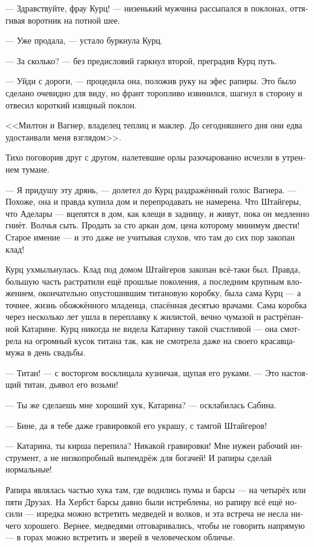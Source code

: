 \documentclass[a4paper,12pt,fleqn]{book}\usepackage{polyglossia}\setdefaultlanguage[babelshorthands=true]{russian}\setotherlanguage{english}\defaultfontfeatures{Ligatures=TeX,Mapping=tex-text}\usepackage{xcolor}\newcommand{\ml}[3]{#2}
\begin{document}
--- Здравствуйте, фрау Курц! --- низенький мужчина рассыпался в поклонах, оттягивая воротник на потной шее.

\ml{$0$}
{--- Уже продала, --- устало буркнула Курц.}
{``Already sold,'' Kurz wearily grumped.}

--- За сколько? --- без предисловий гаркнул второй, преградив Курц путь.

\ml{$0$}
{--- Уйди с дороги, --- процедила она, положив руку на эфес рапиры.}
{``You're on my way, man,'' she hissed with her hand on the foil hilt.}
Это было сделано очевидно для виду, но франт торопливо извинился, шагнул в сторону и отвесил короткий изящный поклон.

<<Милтон и Вагнер, владелец теплиц и маклер.
До сегодняшнего дня они едва удостаивали меня взглядом>>.

Тихо поговорив друг с другом, налетевшие орлы разочарованно исчезли в утреннем тумане.

--- Я придушу эту дрянь, --- долетел до Курц раздражённый голос Вагнера.
--- Похоже, она и правда купила дом и перепродавать не намерена.
Что Штайгеры, что Аделары --- вцепятся в дом, как клещи в задницу, и живут, пока он медленно гниёт.
Волчья сыть.
Продать за сто аркан дом, цена которому минимум двести!
Старое имение --- и это даже не учитывая слухов, что там до сих пор закопан клад!

Курц ухмыльнулась.
Клад под домом Штайгеров закопан всё-таки был.
Правда, большую часть растратили ещё прошлые поколения, а последним крупным вложением, окончательно опустошившим титановую коробку, была сама Курц --- а точнее, жизнь обожжённого младенца, спасённая десятью врачами.
Сама коробка через несколько лет ушла в переплавку к жилистой, вечно чумазой и растрёпанной Катарине.
Курц никогда не видела Катарину такой счастливой --- она смотрела на огромный кусок титана так, как не смотрела даже на своего красавца-мужа в день свадьбы.

--- Титан! --- с восторгом восклицала кузничая, щупая его руками.
--- Это настоящий титан, дьявол его возьми!

--- Ты же сделаешь мне хороший хук, Катарина? --- осклабилась Сабина.

--- Бине, да я тебе даже гравировкой его украшу, с тамгой Штайгеров!

--- Катарина, ты кирша перепила?
Никакой гравировки!
Мне нужен рабочий инструмент, а не низкопробный выпендрёж для богачей!
И рапиры сделай нормальные!

Рапира являлась частью хука там, где водились пумы и барсы --- на четырёх или пяти Друзах.
На Хербст барсы давно были истреблены, но рапиру всё ещё носили --- изредка можно встретить медведей и волков, и эта встреча не несла ничего хорошего.
Вернее, медведями отговаривались, чтобы не говорить напрямую --- в горах можно встретить и зверей в человеческом обличье.
\end{document}
